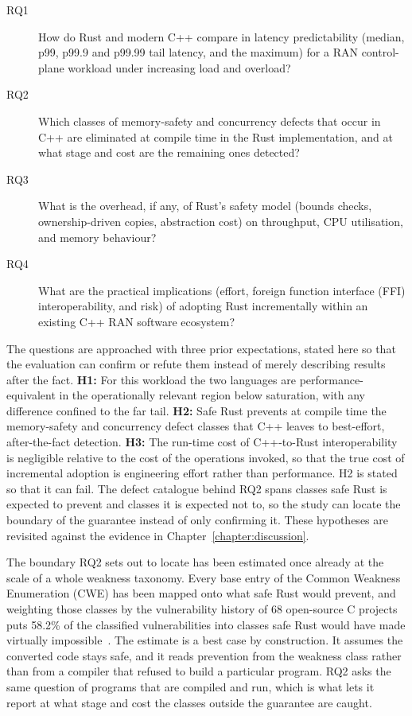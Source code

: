 \documentclass[english,twoside,openright,a4paper,censored,csm,software-track-2020]{HYthesisML}
\begin{document}
\begin{description}
  \item[RQ1] How do Rust and modern C++ compare in latency predictability (median, p99,
        p99.9 and p99.99 tail latency, and the maximum) for a RAN control-plane workload
        under increasing load and overload?
  \item[RQ2] Which classes of memory-safety and concurrency defects that occur in C++ are
        eliminated at compile time in the Rust implementation, and at what stage and cost
        are the remaining ones detected?
  \item[RQ3] What is the overhead, if any, of Rust's safety model (bounds checks,
        ownership-driven copies, abstraction cost) on throughput, CPU utilisation, and
        memory behaviour?
  \item[RQ4] What are the practical implications (effort, foreign function interface (FFI)
        interoperability, and risk) of adopting Rust incrementally within an existing C++ RAN
        software ecosystem?
\end{description}

The questions are approached with three prior expectations, stated here so that the evaluation
can confirm or refute them instead of merely describing results after the fact. \textbf{H1:} For
this workload the two languages are performance-equivalent in the operationally relevant region
below saturation, with any difference confined to the far tail. \textbf{H2:} Safe Rust prevents
at compile time the memory-safety and concurrency defect classes that C++ leaves to
best-effort, after-the-fact detection. \textbf{H3:} The run-time cost of C++-to-Rust
interoperability is negligible relative to the cost of the operations invoked, so that the true
cost of incremental adoption is engineering effort rather than performance. H2 is stated so that
it can fail. The defect catalogue behind RQ2 spans classes safe Rust is expected to prevent and
classes it is expected not to, so the study can locate the boundary of the guarantee instead of
only confirming it. These hypotheses are revisited against the evidence in
Chapter~\ref{chapter:discussion}.

The boundary RQ2 sets out to locate has been estimated once already at the scale of a whole
weakness taxonomy. Every base entry of the Common Weakness Enumeration (CWE) has been mapped
onto what safe Rust would prevent, and weighting those classes by the vulnerability history of
68 open-source C projects puts 58.2\% of the classified vulnerabilities into classes safe Rust
would have made virtually impossible~\cite{meneely2025justuserust}. The estimate is a best case
by construction. It assumes the converted code stays safe, and it reads prevention from the
weakness class rather than from a compiler that refused to build a particular program. RQ2 asks
the same question of programs that are compiled and run, which is what lets it report at what
stage and cost the classes outside the guarantee are caught.
\end{document}
